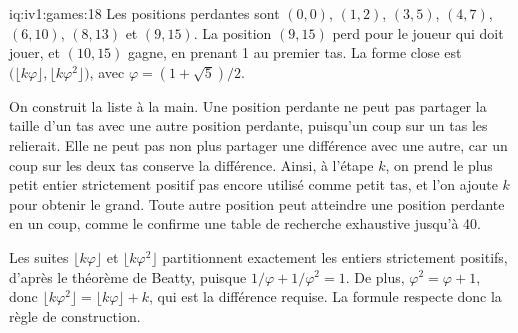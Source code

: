 \begin{solution}{iq:iv1:games:18}
Les positions perdantes sont $(0, 0)$, $(1, 2)$, $(3, 5)$, $(4, 7)$, $(6, 10)$, $(8, 13)$ et $(9, 15)$. La position $(9, 15)$ perd pour le joueur qui doit jouer, et $(10, 15)$ gagne, en prenant 1 au premier tas. La forme close est $\bigl(\lfloor k\varphi \rfloor, \lfloor k\varphi^2 \rfloor\bigr)$, avec $\varphi = (1 + \sqrt{5})/2$.

On construit la liste à la main. Une position perdante ne peut pas partager la taille d'un tas avec une autre position perdante, puisqu'un coup sur un tas les relierait. Elle ne peut pas non plus partager une différence avec une autre, car un coup sur les deux tas conserve la différence. Ainsi, à l'étape $k$, on prend le plus petit entier strictement positif pas encore utilisé comme petit tas, et l'on ajoute $k$ pour obtenir le grand. Toute autre position peut atteindre une position perdante en un coup, comme le confirme une table de recherche exhaustive jusqu'à 40.

Les suites $\lfloor k\varphi \rfloor$ et $\lfloor k\varphi^2 \rfloor$ partitionnent exactement les entiers strictement positifs, d'après le théorème de Beatty, puisque $1/\varphi + 1/\varphi^2 = 1$. De plus, $\varphi^2 = \varphi + 1$, donc $\lfloor k\varphi^2 \rfloor = \lfloor k\varphi \rfloor + k$, qui est la différence requise. La formule respecte donc la règle de construction.

\end{solution}

